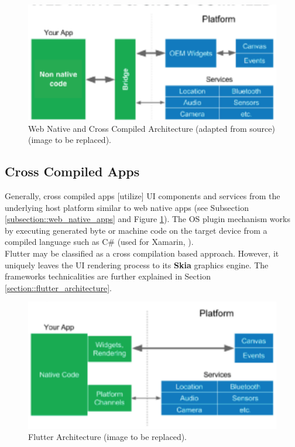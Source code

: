 \begin{figure}
    \includegraphics[width=\linewidth]{images/architectures/native_web_app_architecture.eps}
    \caption{Web Native and Cross Compiled Architecture (adapted from source) (image to be replaced).}
    \label{fig:web_native_architecture}
\end{figure}

\subsection{Cross Compiled Apps}
Generally, cross compiled apps [utilize] UI components and services from the underlying host platform similar to web native apps (see Subsection \ref{subsection::web_native_apps} and Figure \ref{fig:web_native_architecture}).
The OS plugin mechanism works by executing generated byte or machine code on the target device from a compiled language such as C\# (used for Xamarin, \cite{Xamarin2021}).\\
Flutter may be classified as a cross compilation based approach. However, it uniquely leaves the UI rendering process to its \textbf{Skia} graphics engine.
The frameworks technicalities are further explained in Section \ref{section::flutter_architecture}.

\begin{figure}
    \includegraphics[width=\linewidth]{images/architectures/flutter_architecture.eps}
    \caption{Flutter Architecture (image to be replaced).}
    \label{fig:flutter_architecture}
\end{figure}

